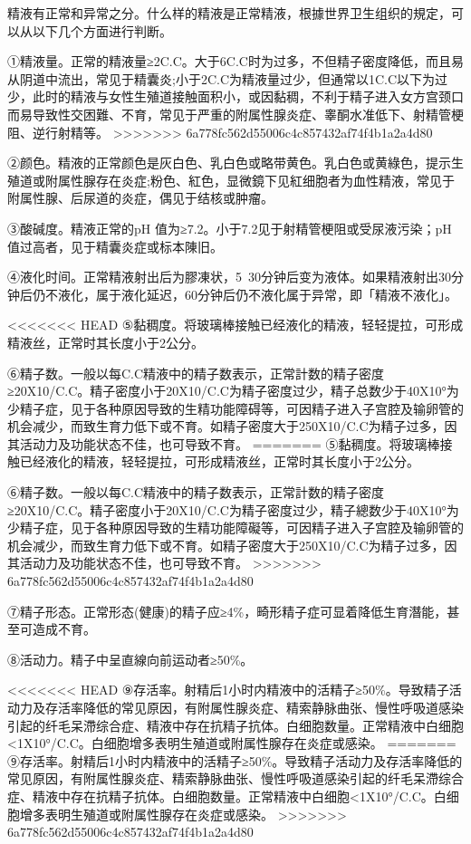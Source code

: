 \documentclass[12pt,UTF8]{ctexbook}
\begin{document}
精液有正常和异常之分。什么样的精液是正常精液，根據世界卫生组织的規定，可以从以下几个方面进行判断。

①精液量。正常的精液量≥2C.C。大于6C.C时为过多，不但精子密度降低，而且易从阴道中流出，常见于精囊炎;小于2C.C为精液量过少，但通常以1C.C以下为过少，此时的精液与女性生殖道接触面积小，或因黏稠，不利于精子进入女方宫颈口而易导致性交困難、不育，常见于严重的附属性腺炎症、睾酮水准低下、射精管梗阻、逆行射精等。
>>>>>>> 6a778fc562d55006c4c857432af74f4b1a2a4d80

②颜色。精液的正常颜色是灰白色、乳白色或略带黄色。乳白色或黄綠色，提示生殖道或附属性腺存在炎症;粉色、紅色，显微鏡下见紅细胞者为血性精液，常见于附属性腺、后尿道的炎症，偶见于结核或肿瘤。

③酸碱度。精液正常的pH 值为≥7.2。小于7.2见于射精管梗阻或受尿液污染；pH值过高者，见于精囊炎症或标本陳旧。

④液化时间。正常精液射出后为膠凍状，5~30分钟后变为液体。如果精液射出30分钟后仍不液化，属于液化延迟，60分钟后仍不液化属于异常，即「精液不液化」。

<<<<<<< HEAD
⑤黏稠度。将玻璃棒接触已经液化的精液，轻轻提拉，可形成精液丝，正常时其长度小于2公分。

⑥精子数。一般以每C.C精液中的精子数表示，正常計数的精子密度≥20X10/C.C。精子密度小于20X10/C.C为精子密度过少，精子总数少于40X10°为少精子症，见于各种原因导致的生精功能障碍等，可因精子进入子宫腔及输卵管的机会减少，而致生育力低下或不育。如精子密度大于250X10/C.C为精子过多，因其活动力及功能状态不佳，也可导致不育。
=======
⑤黏稠度。将玻璃棒接触已经液化的精液，轻轻提拉，可形成精液丝，正常时其长度小于2公分。

⑥精子数。一般以每C.C精液中的精子数表示，正常計数的精子密度≥20X10/C.C。精子密度小于20X10/C.C为精子密度过少，精子總数少于40X10°为少精子症，见于各种原因导致的生精功能障礙等，可因精子进入子宫腔及输卵管的机会减少，而致生育力低下或不育。如精子密度大于250X10/C.C为精子过多，因其活动力及功能状态不佳，也可导致不育。
>>>>>>> 6a778fc562d55006c4c857432af74f4b1a2a4d80

⑦精子形态。正常形态(健康)的精子应≥4\%，畸形精子症可显着降低生育潛能，甚至可造成不育。

⑧活动力。精子中呈直線向前运动者≥50\%。

<<<<<<< HEAD
⑨存活率。射精后1小时内精液中的活精子≥50\%。导致精子活动力及存活率降低的常见原因，有附属性腺炎症、精索静脉曲张、慢性呼吸道感染引起的纤毛呆滯综合症、精液中存在抗精子抗体。白细胞数量。正常精液中白细胞<1X10°/C.C。白细胞增多表明生殖道或附属性腺存在炎症或感染。
=======
⑨存活率。射精后1小时内精液中的活精子≥50\%。导致精子活动力及存活率降低的常见原因，有附属性腺炎症、精索静脉曲张、慢性呼吸道感染引起的纤毛呆滯综合症、精液中存在抗精子抗体。白细胞数量。正常精液中白细胞<1X10°/C.C。白细胞增多表明生殖道或附属性腺存在炎症或感染。
>>>>>>> 6a778fc562d55006c4c857432af74f4b1a2a4d80
\end{document}
